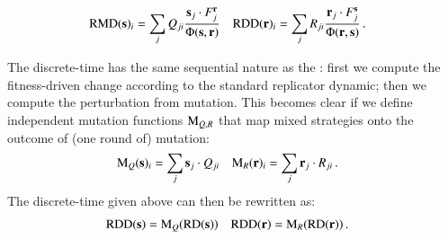 \begin{align*}
  \mathrm{RMD}(\mathrm{\mathbf{s}})_i & = \sum_{j} Q_{ji} \frac{\mathrm{\mathbf{s}}_j \cdot
    F_j^{\mathrm{\mathbf{r}}}}{ \Phi(\mathrm{\mathbf{s}},\mathrm{\mathbf{r}})} & \mathrm{RDD}(\mathrm{\mathbf{r}})_i & =
  \sum_{j} R_{ji} \frac{\mathrm{\mathbf{r}}_j \cdot F_j^{\mathrm{\mathbf{s}}}}{
    \Phi(\mathrm{\mathbf{r}},\mathrm{\mathbf{s}})}\,.
\end{align*}


The discrete-time \rmd has the same sequential nature as the \rdd:
first we compute the fitness-driven change according to the standard
replicator dynamic; then we compute the perturbation from
mutation. This becomes clear if we define independent mutation
functions $\mathrm{M}_{Q,R}$ that map mixed strategies onto the outcome
of (one round of) mutation:
\begin{align*}
  \mathrm{M}_Q(\mathrm{\mathbf{s}})_i & =  \sum_j  \mathrm{\mathbf{s}}_j \cdot
  Q_{ji} &   \mathrm{M}_R(\mathrm{\mathbf{r}})_i & =  \sum_{j}  \mathrm{\mathbf{r}}_j \cdot
  R_{ji} \,.
\end{align*}
The discrete-time \rmd given above can then be rewritten as:
\begin{align*}
  \mathrm{RDD}(\mathrm{\mathbf{s}}) &= \mathrm{M}_Q(\mathrm{RD}(\mathrm{\mathbf{s}})) &   \mathrm{RDD}(\mathrm{\mathbf{r}}) &= \mathrm{M}_R(\mathrm{RD}(\mathrm{\mathbf{r}}))\,. 
\end{align*}



